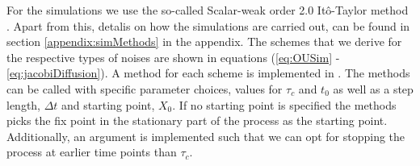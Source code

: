 For the simulations we use the so-called Scalar-weak order 2.0 Itô-Taylor method \cite[algorithm 8.5]{Srkk2019}. Apart from this, detalis on how the simulations are carried out, can be found in section \ref{appendix:simMethods} in the appendix. The schemes that we derive for the respective types of noises are shown in equations (\ref{eq:OUSim} - \ref{eq:jacobiDiffusion}). A method for each scheme is implemented in . The methods can be called with specific parameter choices, values for $\tau_c$ and $t_0$ as well as a step length, $\Delta t$ and starting point, $X_0$. If no starting point is specified the methods picks the fix point in the stationary part of the process as the starting point. Additionally, an argument is implemented such that we can opt for stopping the process at earlier time points than $\tau_c$.